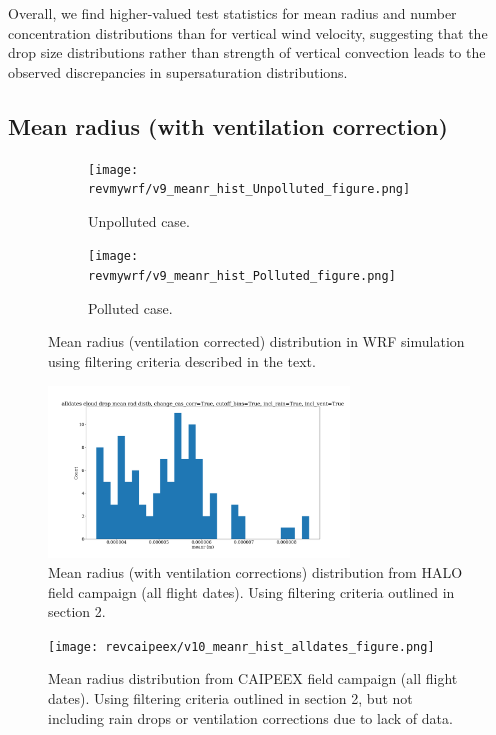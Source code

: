 \documentclass{article}
\begin{document}
Overall, we find higher-valued test statistics for mean radius and number concentration distributions than for vertical wind velocity, suggesting that the drop size distributions rather than strength of vertical convection leads to the observed discrepancies in supersaturation distributions.

\clearpage
\newpage

\subsection{Mean radius (with ventilation correction)}

\begin{figure}[ht]
	\centering
	\begin{subfigure}{0.7\textwidth}
		\texttt{[image: revmywrf/v9\_meanr\_hist\_Unpolluted\_figure.png]}
		\caption{Unpolluted case.}
		\label{wrfmeanrhistunpoll}
	\end{subfigure}
	\begin{subfigure}{0.7\textwidth}
		\texttt{[image: revmywrf/v9\_meanr\_hist\_Polluted\_figure.png]}
		\caption{Polluted case.}
		\label{wrfmeanrhistpoll}
	\end{subfigure}
	\caption{Mean radius (ventilation corrected) distribution in WRF simulation using filtering criteria described in the text.}
	\label{wrfmeanrhist}
\end{figure}
\begin{figure}[ht]
    \centering
    \includegraphics[width=8cm]{revhalo/v24_meanr_hist_cas_alldates_figure.png}
    \caption{Mean radius (with ventilation corrections) distribution from HALO field campaign (all flight dates). Using filtering criteria outlined in section 2.}
    \label{haloqsshist}
\end{figure}
\begin{figure}[ht]
    \centering
    \texttt{[image: revcaipeex/v10\_meanr\_hist\_alldates\_figure.png]}
    \caption{Mean radius distribution from CAIPEEX field campaign (all flight dates). Using filtering criteria outlined in section 2, but not including rain drops or ventilation corrections due to lack of data.}
    \label{caipeexqsshist}
\end{figure}
\end{document}
